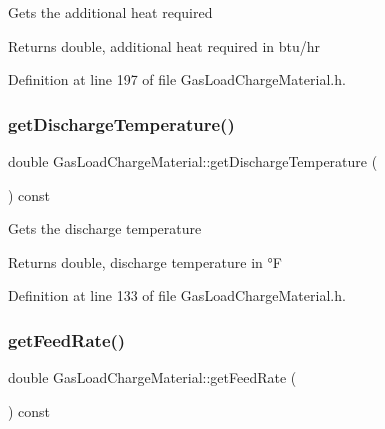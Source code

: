Gets the additional heat required \begin{DoxyReturn}{Returns}
double, additional heat required in btu/hr 
\end{DoxyReturn}


Definition at line 197 of file Gas\+Load\+Charge\+Material.\+h.

\mbox{\label{class_gas_load_charge_material_a6baaf6ad65e2a3d1fa90b7c007bc3c53}} 
\subsubsection{\texorpdfstring{get\+Discharge\+Temperature()}{getDischargeTemperature()}}
{\footnotesize\ttfamily double Gas\+Load\+Charge\+Material\+::get\+Discharge\+Temperature (\begin{DoxyParamCaption}{ }\end{DoxyParamCaption}) const\hspace{0.3cm}{\ttfamily [inline]}}

Gets the discharge temperature \begin{DoxyReturn}{Returns}
double, discharge temperature in °F 
\end{DoxyReturn}


Definition at line 133 of file Gas\+Load\+Charge\+Material.\+h.

\mbox{\label{class_gas_load_charge_material_ae14ebe9b7091a491166174968505b6ee}} 
\subsubsection{\texorpdfstring{get\+Feed\+Rate()}{getFeedRate()}}
{\footnotesize\ttfamily double Gas\+Load\+Charge\+Material\+::get\+Feed\+Rate (\begin{DoxyParamCaption}{ }\end{DoxyParamCaption}) const\hspace{0.3cm}{\ttfamily [inline]}}

